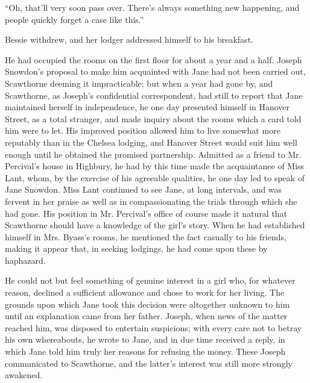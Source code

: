 ``Oh, that'll very soon pass over. There's always something new
happening, and people quickly forget a case like this.''

Bessie withdrew, and her lodger addressed himself to his breakfast.

He had occupied the rooms on the first floor for about a year and a
half. Joseph Snowdon's proposal to make him acquainted with Jane had not
been carried out, Scawthorne deeming it impracticable; but when a year
had gone by, and Scawthorne, as Joseph's confidential correspondent, had
still to report that Jane maintained herself in independence, he one day
presented himself in Hanover Street, as a total stranger, and made
inquiry about the rooms which a card told him were to let. His improved
position allowed him to live somewhat more reputably than in the Chelsea
lodging, and Hanover Street would suit him {}well enough until he
obtained the promised partnership. Admitted as a friend to Mr.
Percival's house in Highbury, he had by this time made the acquaintance
of Miss Lant, whom, by the exercise of his agreeable qualities, he one
day led to speak of Jane Snowdon. Miss Lant continued to see Jane, at
long intervals, and was fervent in her praise as well as in
compassionating the trials through which she had gone. His position in
Mr. Percival's office of course made it natural that Scawthorne should
have a knowledge of the girl's story. When he had established himself in
Mrs. Byass's rooms, he mentioned the fact casually to his friends,
making it appear that, in seeking lodgings, he had come upon these by
haphazard.

He could not but feel something of genuine interest in a girl who, for
whatever reason, declined a sufficient allowance and chose to work for
her living. The grounds upon which Jane took this decision were
altogether unknown to him until an explanation came from her father.
Joseph, when news of the matter reached him, was disposed to entertain
suspicions; with every care not to betray his own whereabouts, he wrote
to Jane, and in due {}time received a reply, in which Jane told him
truly her reasons for refusing the money. These Joseph communicated to
Scawthorne, and the latter's interest was still more strongly awakened.

